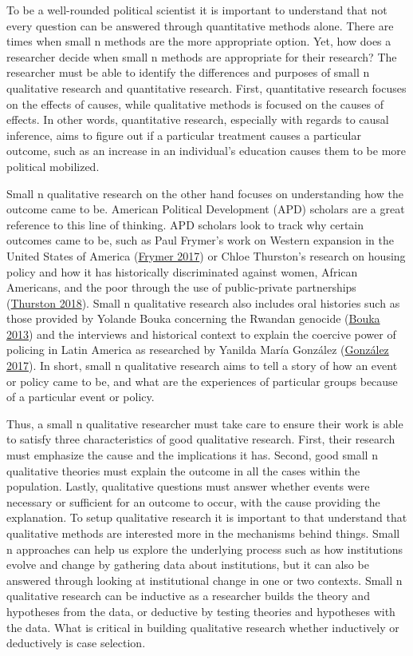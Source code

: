 \documentclass{book}
\begin{document}
To be a well-rounded political scientist it is important to understand that
not every question can be answered through quantitative methods alone. There
are times when small n methods are the more appropriate option. Yet, how does
a researcher decide when small n methods are appropriate for their research?
The researcher must be able to identify the differences and purposes of small
n qualitative research and quantitative research. First, quantitative research
focuses on the effects of causes, while qualitative methods is focused on the
causes of effects. In other words, quantitative research, especially with
regards to causal inference, aims to figure out if a particular treatment
causes a particular outcome, such as an increase in an individual's education
causes them to be more political mobilized.

Small n qualitative research on the other hand focuses on understanding how
the outcome came to be. American Political Development (APD) scholars are a
great reference to this line of thinking. APD scholars look to track why
certain outcomes came to be, such as Paul Frymer's work on Western expansion
in the United States of America (\protect\hyperlink{ref-frymer2017a}{Frymer
2017}) or Chloe Thurston's research on housing policy and how it has
historically discriminated against women, African Americans, and the poor
through the use of public-private partnerships
(\protect\hyperlink{ref-thurston2018a}{Thurston 2018}). Small n qualitative
research also includes oral histories such as those provided by Yolande Bouka
concerning the Rwandan genocide (\protect\hyperlink{ref-bouka2013a}{Bouka
2013}) and the interviews and historical context to explain the coercive power
of policing in Latin America as researched by Yanilda María González
(\protect\hyperlink{ref-gonz2017a}{González 2017}). In short, small n
qualitative research aims to tell a story of how an event or policy came to
be, and what are the experiences of particular groups because of a particular
event or policy.

Thus, a small n qualitative researcher must take care to ensure their work is
able to satisfy three characteristics of good qualitative research. First,
their research must emphasize the cause and the implications it has. Second,
good small n qualitative theories must explain the outcome in all the cases
within the population. Lastly, qualitative questions must answer whether
events were necessary or sufficient for an outcome to occur, with the cause
providing the explanation. To setup qualitative research it is important to
that understand that qualitative methods are interested more in the mechanisms
behind things. Small n approaches can help us explore the underlying process
such as how institutions evolve and change by gathering data about
institutions, but it can also be answered through looking at institutional
change in one or two contexts. Small n qualitative research can be inductive
as a researcher builds the theory and hypotheses from the data, or deductive
by testing theories and hypotheses with the data. What is critical in building
qualitative research whether inductively or deductively is case selection.
\end{document}
